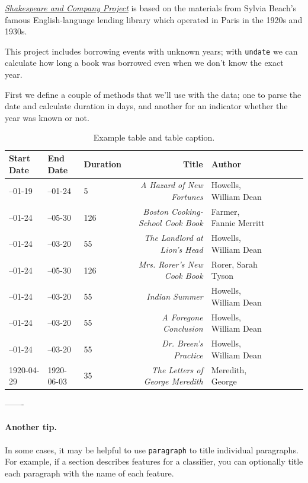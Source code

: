 \documentclass{anthology-ch}         %
\begin{document}
\href{https://shakespeareandco.princeton.edu/}{\textit{Shakespeare and Company
Project}} is based on the materials from Sylvia Beach's famous
English-language lending library which operated in Paris in the 1920s
and 1930s.

This project includes borrowing events with unknown years; with
\texttt{undate} we can calculate how long a book was borrowed even when
we don't know the exact year.

First we define a couple of methods that we'll use with the data; one to
parse the date and calculate duration in days, and another for an
indicator whether the year was known or not.


\begin{table}[h]
  \centering 
  \begin{tabular}{lllrllrrl}
    \toprule
    Start Date & End Date & Duration & Title & Author \\ 
    \midrule
--01-19 & --01-24 & 5 & \textit{A Hazard of New Fortunes} & Howells, William Dean \\
--01-24 & --05-30 & 126 & \textit{Boston Cooking-School Cook Book} & Farmer, Fannie Merritt \\
--01-24 & --03-20 & 55 & \textit{The Landlord at Lion's Head} & Howells, William Dean \\
--01-24 & --05-30 & 126 & \textit{Mrs. Rorer's New Cook Book} & Rorer, Sarah Tyson \\
--01-24 & --03-20 & 55 & \textit{Indian Summer} & Howells, William Dean \\
--01-24 & --03-20 & 55 & \textit{A Foregone Conclusion} & Howells, William Dean \\
--01-24 & --03-20 & 55 & \textit{Dr. Breen's Practice} & Howells, William Dean \\
1920-04-29 & 1920-06-03 & 35 & \textit{The Letters of George Meredith} & Meredith, George \\
    \bottomrule
  \end{tabular}
  \caption{Example table and table caption.}
  \label{tab:example}
\end{table}




-------


\paragraph{Another tip.} In some cases, it may be helpful to use \texttt{paragraph} to title individual paragraphs. For example, if a section describes features for a classifier, you can optionally title each paragraph with the name of each feature. 
\end{document}
